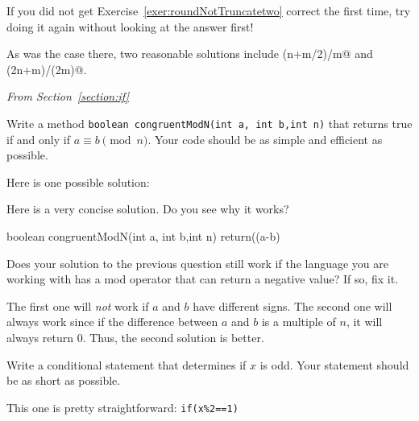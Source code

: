 \begin{requ}
If you did not get Exercise~\ref{exer:roundNotTruncatetwo}
correct the first time,
try doing it again without looking at the answer first!
\begin{requanswer}
As was the case there,
two reasonable solutions include \verb@(n+m/2)/m@ and \verb@(2n+m)/(2m)@.
\end{requanswer}
\end{requ}


\medskip 

\noindent
{\em From Section~\ref{section:if}}

\begin{requ}
Write a method \verb+boolean congruentModN(int a, int b,int n)+
that returns true if and only if $a\equiv b \pmod n$.
Your code should be as simple and efficient as possible.
\begin{requanswer}
Here is one possible solution:
Here is a very concise solution. Do you see why it works?
\begin{code}
boolean congruentModN(int a, int b,int n) {
    return((a-b)%
}
\end{code}
\end{requanswer}
\end{requ}

\begin{requ}
Does your solution to the previous question still work if 
the language you are working with has a mod operator
that can return a negative value? If so, fix it.
\begin{requanswer}
The first one will {\em not} work if $a$ and $b$ have different signs.
The second one will always work since if the difference between
$a$ and $b$ is a multiple of $n$, it will always return $0$.
Thus, the second solution is better.
\end{requanswer}
\end{requ}


\begin{requ}
Write a conditional statement that determines if $x$ is odd. 
Your statement should be as short as possible.
\begin{requanswer}
This one is pretty straightforward: \verb+if(x%2==1)+
\end{requanswer}
\end{requ}

